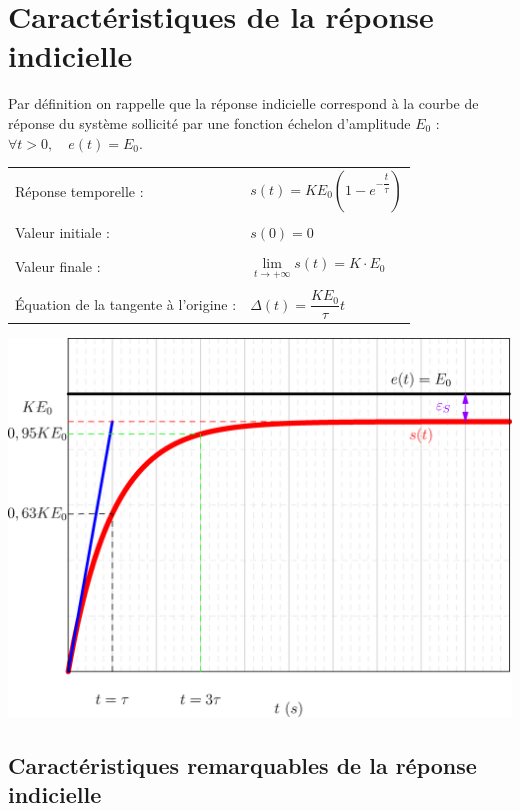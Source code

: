 \documentclass[11pt,oneside]{article}
\begin{document}
\section{Caractéristiques de la réponse indicielle}
Par définition on rappelle que la réponse indicielle correspond à la courbe de réponse du système sollicité par une fonction échelon d'amplitude $E_0$ : $\forall t>0,\quad  e(t)=E_0 $.



\begin{minipage}[c]{.4\linewidth}
\begin{center}
\begin{tabular}{ll}
Réponse temporelle : & $
s(t)=KE_0 \left( 1-e^{-\dfrac{t}{\tau}}\right)
$ \\
& \\
Valeur initiale : & $s(0)=0$ \\
& \\
Valeur finale : & $\lim\limits_{t\to +\infty }s(t)=K\cdot E_0$\\
& \\
Équation de la tangente à l'origine : & $\Delta(t)= \dfrac{KE_0}{\tau} t$\\
\end{tabular}
\end{center}
\end{minipage}

\begin{center}
 \includegraphics[width=.65\textwidth]{png/ordre1_echelon}
\end{center}



\subsection*{Caractéristiques remarquables de la réponse indicielle}
\end{document}
